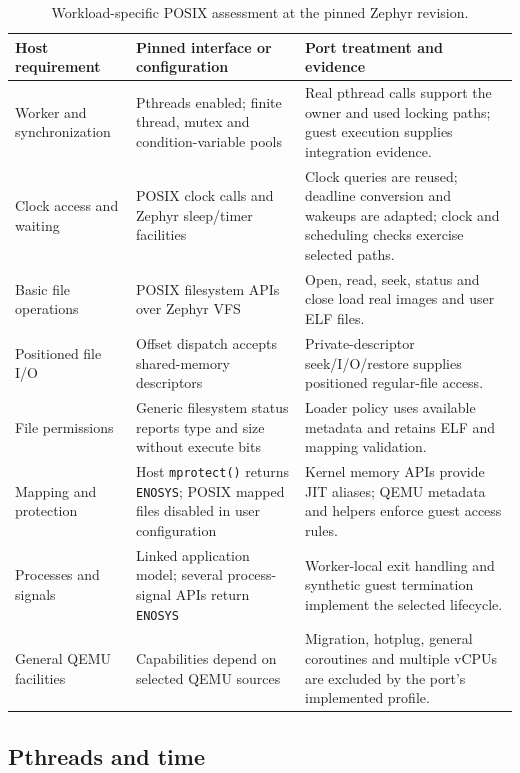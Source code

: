 \documentclass[10pt,a4paper,twocolumn]{article}
\newcommand{\code}[1]{\texttt{#1}}
\begin{document}
\begin{table}[t]
\caption{Workload-specific POSIX assessment at the pinned Zephyr revision.}
\label{tab:posix}
\small
\begin{tabularx}{\textwidth}{@{}>{\raggedright\arraybackslash}p{}YY@{}}
\toprule
Host requirement & Pinned interface or configuration & Port treatment and evidence \\
\midrule
Worker and synchronization & Pthreads enabled; finite thread, mutex and
condition-variable pools & Real pthread calls support the owner and used
locking paths; guest execution supplies integration evidence. \\
Clock access and waiting & POSIX clock calls and Zephyr sleep/timer facilities &
Clock queries are reused; deadline conversion and wakeups are adapted;
clock and scheduling checks exercise selected paths. \\
Basic file operations & POSIX filesystem APIs over Zephyr VFS &
Open, read, seek, status and close load real images and user ELF files. \\
Positioned file I/O & Offset dispatch accepts shared-memory descriptors &
Private-descriptor seek/I/O/restore supplies positioned regular-file access. \\
File permissions & Generic filesystem status reports type and size without
execute bits & Loader policy uses available metadata and retains ELF and
mapping validation. \\
Mapping and protection & Host \code{mprotect()} returns \code{ENOSYS}; POSIX
mapped files disabled in user configuration & Kernel memory APIs provide JIT
aliases; QEMU metadata and helpers enforce guest access rules. \\
Processes and signals & Linked application model; several process-signal APIs
return \code{ENOSYS} & Worker-local exit handling and synthetic guest
termination implement the selected lifecycle. \\
General QEMU facilities & Capabilities depend on selected QEMU sources &
Migration, hotplug, general coroutines and multiple vCPUs are excluded by
the port's implemented profile. \\
\bottomrule
\end{tabularx}
\end{table}

\subsection{Pthreads and time}
\end{document}
